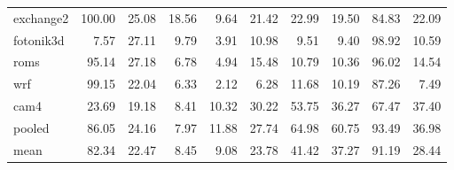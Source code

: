 \documentclass[10pt,a4paper]{article}
\begin{document}
{\begin{longtable}{@{}lrrrrrrrrr@{}}
exchange2 & 100.00 & 25.08 & 18.56 & 9.64 & 21.42 & 22.99 & 19.50 & 84.83 & 22.09 \\
fotonik3d & 7.57 & 27.11 & 9.79 & 3.91 & 10.98 & 9.51 & 9.40 & 98.92 & 10.59 \\
roms & 95.14 & 27.18 & 6.78 & 4.94 & 15.48 & 10.79 & 10.36 & 96.02 & 14.54 \\
wrf & 99.15 & 22.04 & 6.33 & 2.12 & 6.28 & 11.68 & 10.19 & 87.26 & 7.49 \\
cam4 & 23.69 & 19.18 & 8.41 & 10.32 & 30.22 & 53.75 & 36.27 & 67.47 & 37.40 \\
\midrule
pooled & 86.05 & 24.16 & 7.97 & 11.88 & 27.74 & 64.98 & 60.75 & 93.49 & 36.98 \\
mean & 82.34 & 22.47 & 8.45 & 9.08 & 23.78 & 41.42 & 37.27 & 91.19 & 28.44 \\
\end{longtable}
}
\end{document}
